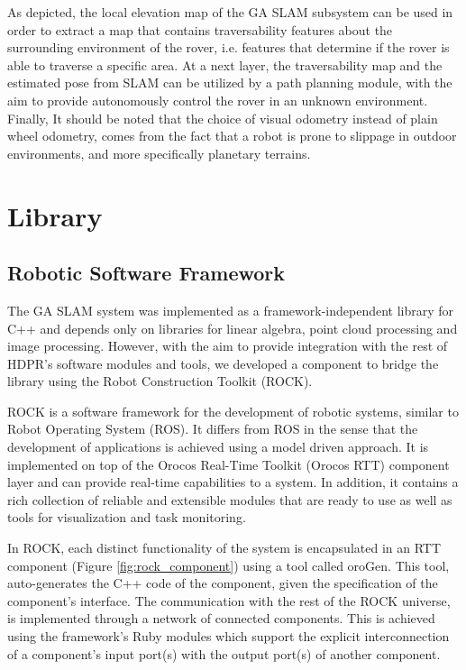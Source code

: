 As depicted, the local elevation map of the GA SLAM subsystem can be used
in order to extract a map that contains traversability features about the
surrounding environment of the rover, i.e. features that determine if
the rover is able to traverse a specific area.
At a next layer, the traversability map and the estimated pose from SLAM
can be utilized by a path planning module, with the aim to provide
autonomously control the rover in an unknown environment.
Finally, It should be noted that the choice of visual odometry
instead of plain wheel odometry, comes from the fact that a robot is prone
to slippage in outdoor environments, and more specifically planetary terrains.

\section{Library}

\subsection{Robotic Software Framework}

The GA SLAM system was implemented as a framework-independent library for C++
and depends only on libraries for linear algebra, point cloud processing
and image processing.
However, with the aim to provide integration with the rest of HDPR's
software modules and tools, we developed a component to bridge
the library using the Robot Construction Toolkit (ROCK).

ROCK is a software framework for the development of robotic systems,
similar to Robot Operating System (ROS).
It differs from ROS in the sense that the development of applications
is achieved using a model driven approach.
It is implemented on top of the Orocos Real-Time Toolkit (Orocos RTT)
component layer and can provide real-time capabilities to a system.
In addition, it contains a rich collection of reliable and extensible
modules that are ready to use as well as tools for visualization and
task monitoring.

In ROCK, each distinct functionality of the system is
encapsulated in an RTT component (Figure \ref{fig:rock_component}) using a
tool called oroGen.
This tool, auto-generates the C++ code of the component, given
the specification of the component's interface.
The communication with the rest of the ROCK universe, is implemented through
a network of connected components.
This is achieved using the framework's Ruby modules which support the explicit
interconnection of a component's input port(s) with the output port(s)
of another component.

